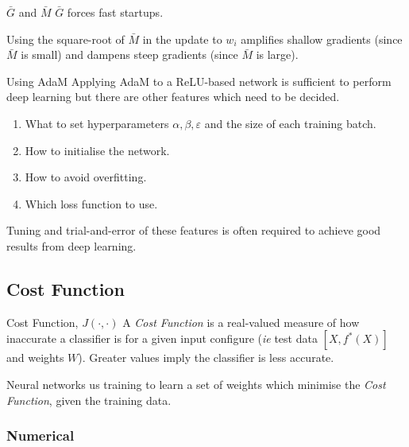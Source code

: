 \documentclass[11pt,a4paper]{article}
\begin{document}
  \begin{remark}{$\bar{G}$ and $\bar{M}$}
    $\bar{G}$ forces fast startups. %
    \par Using the square-root of $\bar{M}$ in the update to $w_i$ amplifies shallow gradients (since $\bar{M}$ is small) and dampens steep gradients (since $\bar{M}$ is large).
  \end{remark}

  \begin{remark}{Using AdaM}
    Applying AdaM to a ReLU-based network is sufficient to perform deep learning but there are other features which need to be decided.
    \begin{enumerate}
      \item What to set hyperparameters $\alpha,\beta,\varepsilon$ and the size of each training batch.
      \item How to initialise the network.
      \item How to avoid overfitting.
      \item Which loss function to use.
    \end{enumerate}
    Tuning and trial-and-error of these features is often required to achieve good results from deep learning.
  \end{remark}

\subsection{Cost Function}

  \begin{definition}{Cost Function, $J(\cdot,\cdot)$}
    A \textit{Cost Function} is a real-valued measure of how inaccurate a classifier is for a given input configure (\textit{ie} test data $[X,f^*(X)]$ and weights $W$). Greater values imply the classifier is less accurate.
    \par Neural networks us training to learn a set of weights which minimise the \textit{Cost Function}, given the training data.
  \end{definition}

\subsubsection{Numerical}
\end{document}
